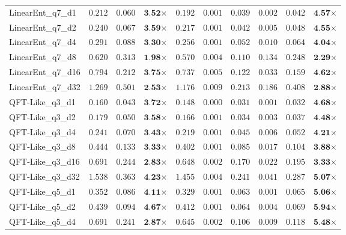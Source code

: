 \begin{table*}[t]
{\begin{tabular}{| l || r r c || r r r r r c |}
LinearEnt\_q7\_d1 & $0.212$ & $0.060$ & $\textbf{3.52}$$\times$ & $0.192$ & $0.001$ & $0.039$ & $0.002$ & $0.042$ & $\textbf{4.57}$$\times$ \\
LinearEnt\_q7\_d2 & $0.240$ & $0.067$ & $\textbf{3.59}$$\times$ & $0.217$ & $0.001$ & $0.042$ & $0.005$ & $0.048$ & $\textbf{4.55}$$\times$ \\
LinearEnt\_q7\_d4 & $0.291$ & $0.088$ & $\textbf{3.30}$$\times$ & $0.256$ & $0.001$ & $0.052$ & $0.010$ & $0.064$ & $\textbf{4.04}$$\times$ \\
LinearEnt\_q7\_d8 & $0.620$ & $0.313$ & $\textbf{1.98}$$\times$ & $0.570$ & $0.004$ & $0.110$ & $0.134$ & $0.248$ & $\textbf{2.29}$$\times$ \\
LinearEnt\_q7\_d16 & $0.794$ & $0.212$ & $\textbf{3.75}$$\times$ & $0.737$ & $0.005$ & $0.122$ & $0.033$ & $0.159$ & $\textbf{4.62}$$\times$ \\
LinearEnt\_q7\_d32 & $1.269$ & $0.501$ & $\textbf{2.53}$$\times$ & $1.176$ & $0.009$ & $0.213$ & $0.186$ & $0.408$ & $\textbf{2.88}$$\times$ \\
QFT-Like\_q3\_d1 & $0.160$ & $0.043$ & $\textbf{3.72}$$\times$ & $0.148$ & $0.000$ & $0.031$ & $0.001$ & $0.032$ & $\textbf{4.68}$$\times$ \\
QFT-Like\_q3\_d2 & $0.179$ & $0.050$ & $\textbf{3.58}$$\times$ & $0.166$ & $0.001$ & $0.034$ & $0.003$ & $0.037$ & $\textbf{4.48}$$\times$ \\
QFT-Like\_q3\_d4 & $0.241$ & $0.070$ & $\textbf{3.43}$$\times$ & $0.219$ & $0.001$ & $0.045$ & $0.006$ & $0.052$ & $\textbf{4.21}$$\times$ \\
QFT-Like\_q3\_d8 & $0.444$ & $0.133$ & $\textbf{3.33}$$\times$ & $0.402$ & $0.001$ & $0.085$ & $0.017$ & $0.104$ & $\textbf{3.88}$$\times$ \\
QFT-Like\_q3\_d16 & $0.691$ & $0.244$ & $\textbf{2.83}$$\times$ & $0.648$ & $0.002$ & $0.170$ & $0.022$ & $0.195$ & $\textbf{3.33}$$\times$ \\
QFT-Like\_q3\_d32 & $1.538$ & $0.363$ & $\textbf{4.23}$$\times$ & $1.455$ & $0.004$ & $0.241$ & $0.041$ & $0.287$ & $\textbf{5.07}$$\times$ \\
QFT-Like\_q5\_d1 & $0.352$ & $0.086$ & $\textbf{4.11}$$\times$ & $0.329$ & $0.001$ & $0.063$ & $0.001$ & $0.065$ & $\textbf{5.06}$$\times$ \\
QFT-Like\_q5\_d2 & $0.439$ & $0.094$ & $\textbf{4.67}$$\times$ & $0.412$ & $0.001$ & $0.064$ & $0.004$ & $0.069$ & $\textbf{5.94}$$\times$ \\
QFT-Like\_q5\_d4 & $0.691$ & $0.241$ & $\textbf{2.87}$$\times$ & $0.645$ & $0.002$ & $0.106$ & $0.009$ & $0.118$ & $\textbf{5.48}$$\times$ \\

\end{tabular}}
\end{table*}

